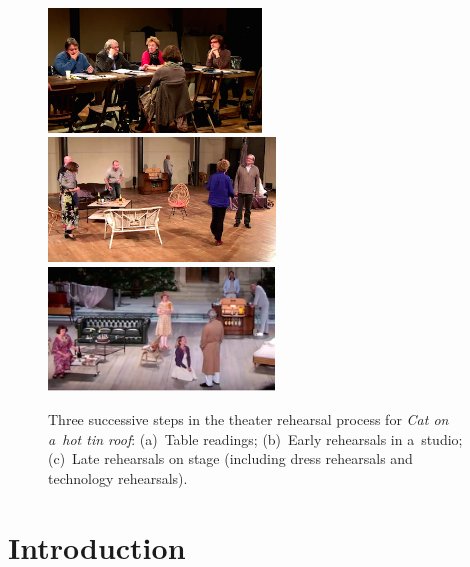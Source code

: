 \documentclass[conference]{IEEEtran}
\newcommand{\todo}[1]{\noindent\textcolor{red}{{\bf \{ToDo} #1{\bf \}}}}
\begin{document}
\begin{figure}[tp]
\centering
\includegraphics[height=3.3cm]{table_rehearsals}
\includegraphics[height=3.3cm]{studio_rehearsals}
\includegraphics[height=3.3cm]{stage_rehearsals}
\caption{Three successive steps in the theater rehearsal process for \emph{Cat on a~hot tin roof}: (a)~Table readings; (b)~Early rehearsals in a~studio; (c)~Late rehearsals on stage (including dress rehearsals and technology rehearsals).}
\label{fig_rehearsals}
\end{figure}


\section{Introduction}
\label{sec:intro}


\end{document}
